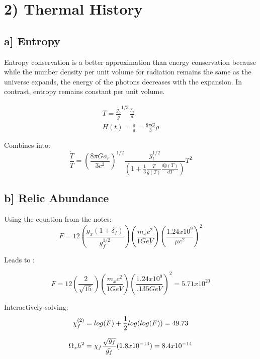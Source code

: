 \documentclass[a4paper,11pt]{article}
\begin{document}
\section*{2) Thermal History}
\subsection*{a] Entropy}
Entropy conservation is a better approximation than energy conservation because while the number density per unit volume for radiation remains the same as the universe expands, the energy of the photons decreases with the expansion.  In contrast, entropy remains constant per unit volume.  


\begin{eqnarray}
T=\frac{\bar{g}_0}{\bar{g}}^{1/3} \frac{T_\gamma}{a} \\
H(t)=\frac{\dot{a}}{a}=\frac{8\pi G}{3}\rho
\end{eqnarray}

Combines into:
\begin{equation}
\frac{\dot{T}}{T}=(\frac{8\pi G a_r}{3c^2})^{1/2}\frac{g_t^{1/2}}{(1+\frac{1}{3}\frac{T}{\bar{g}(T)}\frac{d\bar{g}(T)}{dT})}T^2 
\end{equation}


\subsection*{b] Relic Abundance}
Using the equation from the notes:
\begin{equation}
F=12(\frac{g_x (1+\delta_f)}{g_f^{1/2}})(\frac{m_xc^2}{1GeV})(\frac{1.24x10^9}{\mu c^2})^2
\end{equation}

Leads to :

\begin{equation}
F=12(\frac{2}{\sqrt{15}})(\frac{m_xc^2}{1GeV})(\frac{1.24x10^9}{.135 GeV})^2=5.71x10^{20}
\end{equation}

Interactively solving:
\begin{equation}
\chi_f^{(2)}=log(F)+\frac{1}{2}log(log(F))=49.73  \\
\end{equation}

\begin{equation}
\Omega_xh^2=\chi_f\frac{\sqrt{g_f}}{\bar{g_f}}(1.8x10^{-14})=8.4x10^{-14} \\
\end{equation}
\end{document}
